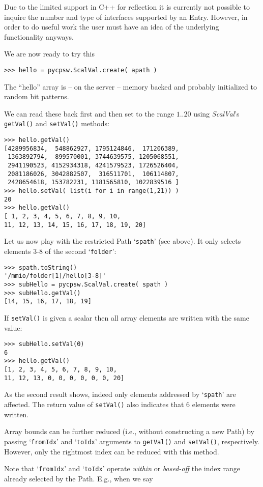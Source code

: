 \documentclass[10pt]{article}
\newcommand{\entry}     {{Entry}}
\newcommand{\Path}      {{Path}}
\newcommand{\cpp}       {C++}
\newcommand{\cod}[1] {{\tt#1}}
\begin{document}
Due to the limited support in \cpp{} for reflection it is currently not possible to 
inquire the number and type of interfaces supported by an \entry{}. However, in
order to do useful work the user must have an idea of the underlying functionality
anyways.

We are now ready to try this
\begin{verbatim}
>>> hello = pycpsw.ScalVal.create( apath )
\end{verbatim}
The ``hello'' array is -- on the server -- memory backed and probably initialized
to random bit patterns.

We can read these back first and then set to the range $1..20$ using {\em ScalVal}'s
\cod{getVal()} and \cod{setVal()} methods:
\begin{verbatim}
>>> hello.getVal()
[4289956834,  548862927, 1795124846,  171206389,
 1363892794,  899570001, 3744639575, 1205068551,
 2941190523, 4152934318, 4241579523, 1726526404,
 2081186026, 3042882507,  316511701,  106114807,
 2428654618, 153782231, 1181565810, 1022839516 ]
>>> hello.setVal( list(i for i in range(1,21)) )
20
>>> hello.getVal()
[ 1, 2, 3, 4, 5, 6, 7, 8, 9, 10,
11, 12, 13, 14, 15, 16, 17, 18, 19, 20]
\end{verbatim}

Let us now play with the restricted \Path{} `\cod{spath}' (see above).
It only selects elements 3-8 of the second `\cod{folder}':
\begin{verbatim}
>>> spath.toString()
'/mmio/folder[1]/hello[3-8]'
>>> subHello = pycpsw.ScalVal.create( spath )
>>> subHello.getVal()
[14, 15, 16, 17, 18, 19]
\end{verbatim}

If \cod{setVal()} is given a scalar then all array elements are written
with the same value:
\begin{verbatim}
>>> subHello.setVal(0)
6
>>> hello.getVal()
[1, 2, 3, 4, 5, 6, 7, 8, 9, 10,
11, 12, 13, 0, 0, 0, 0, 0, 0, 20]
\end{verbatim}
As the second result shows, indeed only elements addressed by `\cod{spath}'
are affected. The return value of \cod{setVal()} also indicates that 6 elements
were written.

Array bounds can be further reduced (i.e., without constructing a new \Path{})
by passing `\cod{fromIdx}' and `\cod{toIdx}' arguments to \cod{getVal()} and
\cod{setVal()}, respectively.
However, only the rightmost index can be reduced with this method.

Note that `\cod{fromIdx}' and `\cod{toIdx}' operate {\em within} or {\em based-off}
the index range already selected by the \Path{}. E.g., when we say
\end{document}
